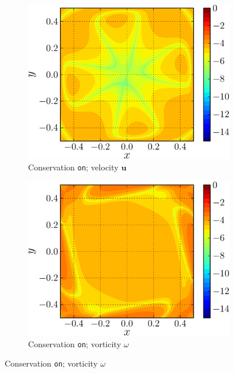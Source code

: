 	\begin{figure}[!t]
     \centering
     \begin{subfigure}[t]{0.45\textwidth}
             \includegraphics[width=\linewidth]{./figures/hybrid/lambOseent2/lambOseen_fully_vErrorFinal_compressed-crop.png}
             \caption{Conservation \texttt{on}; velocity $\mathbf{u}$}
             \label{fig:lambOseen_fullyCon_vErrorFinal}
     \end{subfigure}%
     \qquad %
    \begin{subfigure}[t]{0.45\textwidth}
             \includegraphics[width=\linewidth]{./figures/hybrid/lambOseent2/lambOseen_fully_wErrorFinal_compressed-crop.png}
             \caption{Conservation \texttt{on}; vorticity $\omega$}
             \label{fig:lambOseen_fullyCon_wErrorFinal}
     \end{subfigure}%
            

\end{figure}

